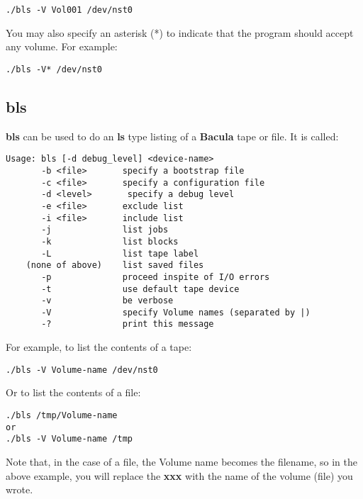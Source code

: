 \footnotesize
\begin{verbatim}
./bls -V Vol001 /dev/nst0
\end{verbatim}
\normalsize

You may also specify an asterisk (*) to indicate that the program should
accept any volume. For example: 

\footnotesize
\begin{verbatim}
./bls -V* /dev/nst0
\end{verbatim}
\normalsize

\subsection*{bls}
\label{bls}

{\bf bls} can be used to do an {\bf ls} type listing of a {\bf Bacula} tape or
file. It is called: 

\footnotesize
\begin{verbatim}
Usage: bls [-d debug_level] <device-name>
       -b <file>       specify a bootstrap file
       -c <file>       specify a configuration file
       -d <level>       specify a debug level
       -e <file>       exclude list
       -i <file>       include list
       -j              list jobs
       -k              list blocks
       -L              list tape label
    (none of above)    list saved files
       -p              proceed inspite of I/O errors
       -t              use default tape device
       -v              be verbose
       -V              specify Volume names (separated by |)
       -?              print this message
\end{verbatim}
\normalsize

For example, to list the contents of a tape: 

\footnotesize
\begin{verbatim}
./bls -V Volume-name /dev/nst0
\end{verbatim}
\normalsize

Or to list the contents of a file: 

\footnotesize
\begin{verbatim}
./bls /tmp/Volume-name
or
./bls -V Volume-name /tmp
\end{verbatim}
\normalsize

Note that, in the case of a file, the Volume name becomes the filename, so in
the above example, you will replace the {\bf xxx} with the name of the volume
(file) you wrote. 

